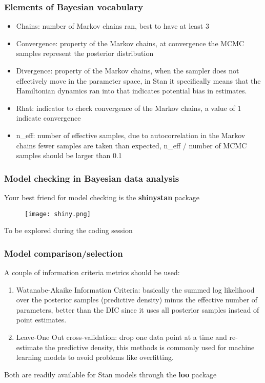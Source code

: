 \documentclass{beamer}
\begin{document}
 \begin{frame}
  \frametitle{\bf Elements of Bayesian vocabulary}
  
   \begin{itemize}
   \item Chains: number of Markov chains ran, best to have at least 3
   \item Convergence: property of the Markov chains, at convergence the MCMC samples represent the posterior distribution
   \item Divergence: property of the Markov chains, when the sampler does not effectively move in the parameter space, in Stan it specifically means that the Hamiltonian dynamics ran into that indicates potential bias in estimates.
   \item Rhat: indicator to check convergence of the Markov chains, a value of 1 indicate convergence
   \item n\_eff: number of effective samples, due to autocorrelation in the Markov chains fewer samples are taken than expected, n\_eff / number of MCMC samples should be larger than 0.1
  \end{itemize}

  
 \end{frame}
 
  \begin{frame}
  \frametitle{\bf Model checking in Bayesian data analysis}
  
  Your best friend for model checking is the \textbf{shinystan} package
  
  \begin{figure}
   \texttt{[image: shiny.png]}
  \end{figure}
  
  To be explored during the coding session

  
 \end{frame}
 
  \begin{frame}
  \frametitle{\bf Model comparison/selection}
  
  A couple of information criteria metrics should be used:
  
  \begin{enumerate}
   \item Watanabe-Akaike Information Criteria: basically the summed log likelihood over the posterior samples (predictive density) minus the effective number of parameters, better than the DIC since it uses all posterior samples instead of point estimates.
   \item Leave-One Out cross-validation: drop one data point at a time and re-estimate the predictive density, this methods is commonly used for machine learning models to avoid problems like overfitting.
  \end{enumerate}
  
  \vspace*{0.2cm}
  
  Both are readily available for Stan models through the \textbf{loo} package

  
 \end{frame}
 
\end{document}
